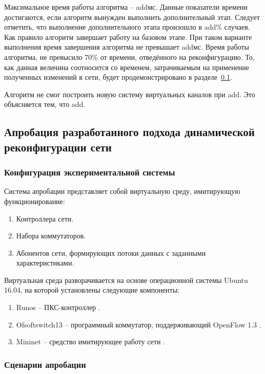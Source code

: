 \documentclass[12pt, a4paper]{article}
\begin{document}
Максимальное время работы алгоритма – addмс. Данные показатели времени достигаются, если алгоритм вынужден выполнить дополнительный этап. Следует отметить, что выполнение дополнительного этапа произошло в add\% случаев. Как правило алгоритм завершает работу на базовом этапе. При таком варианте выполнения время завершения алгоритма не превышает addмс. Время работы алгоритма, не превысило 70\% от времени, отведённого на реконфигурацию. То, как данная величина соотносится со временем, затрачиваемым на применение полученных изменений в сети, будет продемонстрировано в разделе~\ref{subsec:approbation}.

Алгоритм не смог построить новую систему виртуальных каналов при add. Это объясняется тем, что add.

\subsection{Апробация разработанного подхода динамической реконфигурации сети} \label{subsec:approbation}
\subsubsection{Конфигурация экспериментальной системы}
Система апробации представляет собой виртуальную среду, имитирующую
функционирование:
\begin{enumerate}
	\item Контроллера сети.
	\item Набора коммутаторов.
	\item Абонентов сети, формирующих потоки данных с заданными характеристиками.
\end{enumerate}

Виртуальная среда разворачивается на основе операционной системы Ubuntu 16.04,
на которой установлены следующие компоненты:
\begin{enumerate}
	\item Runos -- ПКС-контроллер \cite{runos}.
	\item Ofsoftswitch13 -- программный коммутатор, поддерживающий OpenFlow 1.3 \cite{ofsoftswitch}.
	\item Mininet -- средство имитирующее работу сети \cite{mininet}.
\end{enumerate}

\subsubsection{Сценарии апробации}
\end{document}

